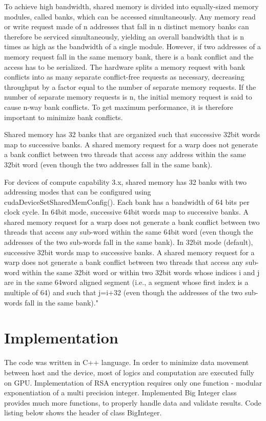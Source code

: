 \documentclass[oneside,openright,12pt,final,en]{mgr}
\begin{document}
To achieve high bandwidth, shared memory is divided into equally-sized memory modules, called banks, which can be accessed simultaneously. Any memory read or write request made of n addresses that fall in n distinct memory banks can therefore be serviced simultaneously, yielding an overall bandwidth that is n times as high as the bandwidth of a single module. However, if two addresses of a memory request fall in the same memory bank, there is a bank conflict and the access has to be serialized. The hardware splits a memory request with bank conflicts into as many separate conflict-free requests as necessary, decreasing throughput by a factor equal to the number of separate memory requests. If the number of separate memory requests is n, the initial memory request is said to cause n-way bank conflicts. To get maximum performance, it is therefore important to minimize bank conflicts.

Shared memory has 32 banks that are organized such that successive 32bit words map to successive banks. A shared memory request for a warp does not generate a bank conflict between two threads that access any address within the same 32bit word (even though the two addresses fall in the same bank).

For devices of compute capability 3.x, shared memory has 32 banks with two addressing modes that can be configured using cudaDeviceSetSharedMemConfig(). Each bank has a bandwidth of 64 bits per clock cycle. In 64bit mode, successive 64bit words map to successive banks. A shared memory request for a warp does not generate a bank conflict between two threads that access any sub-word within the same 64bit word (even though the addresses of the two sub-words fall in the same bank). In 32bit mode (default), successive 32bit words map to successive banks. A shared memory request for a warp does not generate a bank conflict between two threads that access any sub-word within the same 32bit word or within two 32bit words whose indices i and j are in the same 64word aligned segment (i.e., a segment whose first index is a multiple of 64) and such that j=i+32 (even though the addresses of the two sub-words fall in the same bank)."\cite{nsight}

\chapter{Implementation}

The code was written in C++ language. In order to minimize data movement between host and the device, most of logics and computation are executed fully on GPU. Implementation of RSA encryption requires only one function - modular exponentiation of a multi precision integer. Implemented Big Integer class provides much more functions, to properly handle data and validate results. Code listing below shows the header of class BigInteger.
\end{document}

